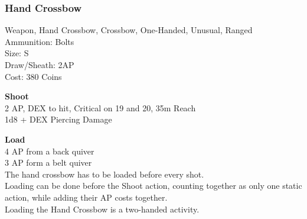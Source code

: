 \subsubsection{Hand Crossbow}\label{weapon:handCrossbow}
Weapon, Hand Crossbow, Crossbow, One-Handed, Unusual, Ranged\\
Ammunition: Bolts\\
Size: S\\
Draw/Sheath: 2AP\\
Cost: 380 Coins

\textbf{Shoot} \\
2 AP, DEX to hit, Critical on 19 and 20, 35m Reach\\
1d8 + \texttimes DEX Piercing Damage

\textbf{Load} \\
4 AP from a back quiver\\
3 AP form a belt quiver\\
The hand crossbow has to be loaded before every shot.\\
Loading can be done before the Shoot action, counting together as only one static action, while adding their AP costs together.\\
Loading the Hand Crossbow is a two-handed activity.
